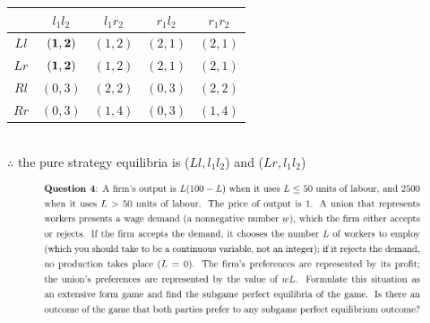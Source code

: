\documentclass[12pt]{article}
\newenvironment{solution}[2][Solution]{\begin{trivlist}
\item[\hskip \labelsep {\bfseries #1}]}{\end{trivlist}}
\begin{document}
\begin{solution}{}
\begin{enumerate}[label=(\alph*)]
\begin{center}
\begin{tabular}{| c || c | c | c | c |}\hline
& $l_1l_2$ & $l_1r_2$ & $r_1l_2$ & $r_1r_2$\\ \hline\hline
$Ll$ & \cellcolor{blue!25}$\bold{(1,2)}$ & $(1,2)$ & $(2,1)$ & $(2,1)$ \\ \hline
$Lr$ & \cellcolor{blue!25}$\bold{(1,2)}$ & $(1,2)$ & $(2,1)$ & $(2,1)$ \\ \hline
$Rl$ & $(0,3)$ & $(2,2)$ & $(0,3)$ & $(2,2)$ \\ \hline
$Rr$ & $(0,3)$ & $(1,4)$ & $(0,3)$ & $(1,4)$ \\ \hline
\end{tabular}\\

$\therefore$ the pure strategy equilibria is ($Ll,l_1l_2$) and ($Lr,l_1l_2$)
\end{center}
\end{enumerate}
\end{solution}

\begin{figure}[h!]
\includegraphics[width=\linewidth]{./assets/201806021727.png}
\end{figure}
\end{document}
